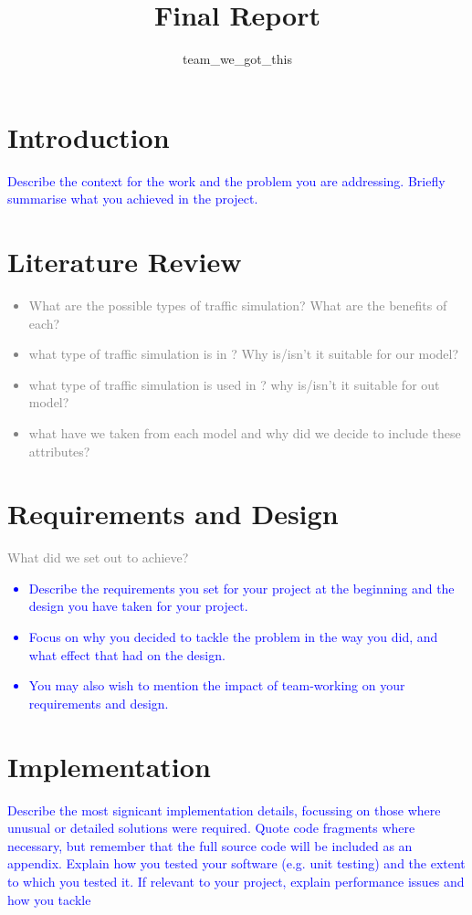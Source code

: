 \documentclass{article}
\title{Final Report}
\author{team\_we\_got\_this}
\begin{document}
\maketitle


\section*{Introduction}
	\textcolor{blue}{Describe the context for the work and the problem you are addressing. 
	Briefly summarise what you achieved in the project.}

\section{Literature Review}
	\textcolor{gray}{
		\begin{itemize}
			\item What are the possible types of traffic simulation? What are the benefits of each? 
			\item what type of traffic simulation is in \cite{namekawa2005general}? Why is/isn't it suitable for our model?
			\item what type of traffic simulation is used in \cite{sewall2010continuum}? why is/isn't it suitable for out model?
			\item what have we taken from each model and why did we decide to include these attributes?
		\end{itemize}
	}

\section{Requirements and Design}
	\textcolor{gray}{What did we set out to achieve?}
	\textcolor{blue}{
	\begin{itemize}
		\item Describe the requirements you set for your project at the beginning and the design you have taken for your project.
		\item  Focus on why you decided to tackle the problem in the way you did, and what effect that had on the design. 
		\item You may also wish to mention the impact of team-working on your requirements and design.
	\end{itemize}
	}

\section{Implementation}
	\textcolor{blue}{Describe the most signicant implementation details, focussing on those where unusual or detailed solutions were required. 
	Quote code fragments where necessary, but remember that the full source code will be included as an appendix. 
	Explain how you tested your software (e.g. unit testing) and the extent to which you tested it. 
	If relevant to your project, explain performance issues and how you tackle}
\end{document}
